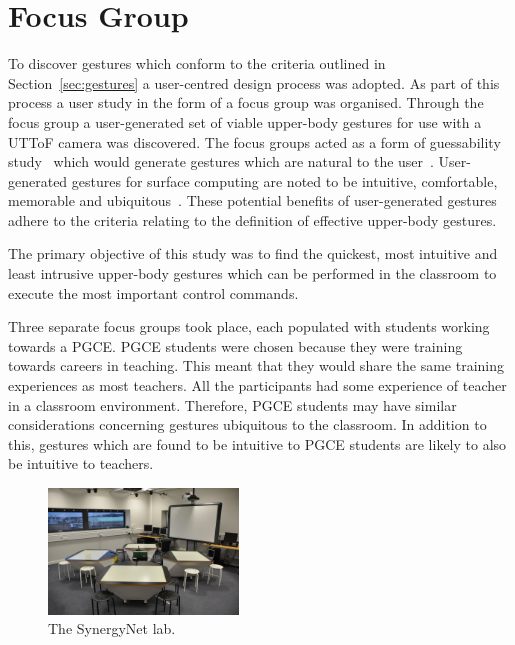 \documentclass[manuscript, review, screen]{acmart}
\begin{document}
\section{Focus Group}  
\label{sec:focusgroup}

To discover gestures which conform to the criteria outlined in Section~\ref{sec:gestures} a user-centred design process was adopted.
As part of this process a user study in the form of a focus group was organised.
Through the focus group a user-generated set of viable upper-body gestures for use with a \ac{UTToF} camera was discovered.
The focus groups acted as a form of guessability study~\citep{Ruiz2011,Wobbrock2009} which would generate gestures which are natural to the user~\citep{Grandhi2011}.
User-generated gestures for surface computing are noted to be intuitive, comfortable, memorable and ubiquitous~\citep{Bjørneseth2012}.
These potential benefits of user-generated gestures adhere to the criteria relating to the definition of effective upper-body gestures.

The primary objective of this study was to find the quickest, most intuitive and least intrusive upper-body gestures which can be performed in the classroom to execute the most important control commands.

Three separate focus groups took place, each populated with students working towards a \ac{PGCE}.
\ac{PGCE} students were chosen because they were training towards careers in teaching.
This meant that they would share the same training experiences as most teachers.
All the participants had some experience of teacher in a classroom environment.
Therefore, \ac{PGCE} students may have similar considerations concerning gestures ubiquitous to the classroom.
In addition to this, gestures which are found to be intuitive to \ac{PGCE} students are likely to also be intuitive to teachers.

\begin{figure}[h]
   \centering
   \includegraphics[width=0.45\textwidth]{figures/synergynet_lab.png}
   \caption{The SynergyNet lab.}
   \label{fig:synergynetLab}
\end{figure}
\end{document}
